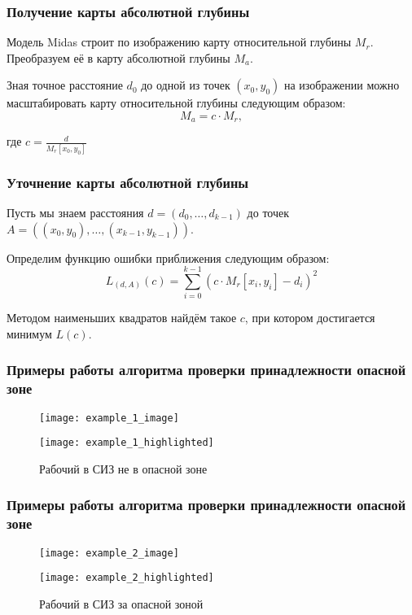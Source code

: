 \begin{frame}
    \frametitle{Получение карты абсолютной глубины}
    Модель Midas строит по изображению карту относительной глубины $M_r$. Преобразуем её в карту абсолютной глубины $M_a$.

    Зная точное расстояние $d_0$ до одной из точек $(x_0, y_0)$ на изображении можно масштабировать карту относительной глубины следующим образом:
    $$ M_a = c \cdot M_r, $$

    где $c = \frac{d}{M_r[x_0, y_0]}$
\end{frame}

\begin{frame}
    \frametitle{Уточнение карты абсолютной глубины}
    Пусть мы знаем расстояния $d = \left(d_0, \dots, d_{k - 1}\right)$ до точек $A = \left((x_0, y_0), \dots, (x_{k - 1}, y_{k - 1})\right)$.

    Определим функцию ошибки приближения следующим образом:
    $$ L_{(d, A)}(c) = \sum\limits_{i = 0}^{k - 1} \left(c \cdot M_r[x_i, y_i] - d_i\right)^2 $$

    Методом наименьших квадратов найдём такое $c$, при котором достигается минимум $L(c)$.
\end{frame}

\begin{frame}
    \frametitle{Примеры работы алгоритма проверки принадлежности опасной зоне}
    \begin{figure}
        \begin{minipage}[!h]{0.49\linewidth}
            \centering
            \texttt{[image: example\_1\_image]}
        \end{minipage}
        \hfill
        \begin{minipage}[!h]{0.49\linewidth}
            \centering
            \texttt{[image: example\_1\_highlighted]}
        \end{minipage}
        \caption{Рабочий в СИЗ не в опасной зоне}
    \end{figure}
\end{frame}

\begin{frame}
    \frametitle{Примеры работы алгоритма проверки принадлежности опасной зоне}
    \begin{figure}
        \begin{minipage}[!h]{0.49\linewidth}
            \centering
            \texttt{[image: example\_2\_image]}
        \end{minipage}
        \hfill
        \begin{minipage}[!h]{0.49\linewidth}
            \centering
            \texttt{[image: example\_2\_highlighted]}
        \end{minipage}
        \caption{Рабочий в СИЗ за опасной зоной}
    \end{figure}
\end{frame}

